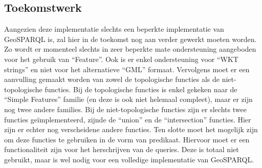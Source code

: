 \subsection{Toekomstwerk}
\label{subsec:toekomstwerk}
Aangezien deze implementatie slechts een beperkte implementatie van GeoSPARQL is, zal hier in de toekomst nog aan verder gewerkt moeten worden. Zo wordt er momenteel slechts in zeer beperkte mate ondersteuning aangeboden voor het gebruik van ``Feature''. Ook is er enkel ondersteuning voor ``WKT strings'' en niet voor het alternatieve ``GML'' formaat. Vervolgens moet er een aanvulling gemaakt worden van zowel de topologische functies als de niet-topologische functies. Bij de topologische functies is enkel gekeken naar de ``Simple Features'' familie (en deze is ook niet helemaal compleet), maar er zijn nog twee andere families. Bij de niet-topologische functies zijn er slechts twee functies geïmplementeerd, zijnde de ``union'' en de ``intersection'' functies. Hier zijn er echter nog verscheidene andere functies. Ten slotte moet het mogelijk zijn om deze functies te gebruiken in de vorm van predikaat. Hiervoor moet er een functionaliteit zijn voor het herschrijven van de queries. Deze is totaal niet gebruikt, maar is wel nodig voor een volledige implementatie van GeoSPARQL. 
